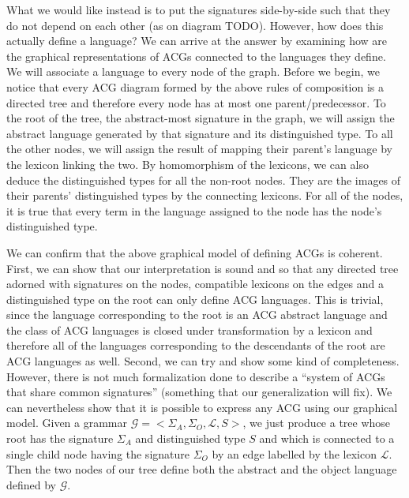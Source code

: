 What we would like instead is to put the signatures side-by-side such
that they do not depend on each other (as on diagram TODO). However, how
does this actually define a language? We can arrive at the answer by
examining how are the graphical representations of ACGs connected to the
languages they define. We will associate a language to every node of the
graph. Before we begin, we notice that every ACG diagram formed by the
above rules of composition is a directed tree and therefore every node
has at most one parent/predecessor. To the root of the tree, the
abstract-most signature in the graph, we will assign the abstract
language generated by that signature and its distinguished type. To all
the other nodes, we will assign the result of mapping their parent's
language by the lexicon linking the two. By homomorphism of the
lexicons, we can also deduce the distinguished types for all the
non-root nodes. They are the images of their parents' distinguished
types by the connecting lexicons. For all of the nodes, it is true that
every term in the language assigned to the node has the node's
distinguished type.

We can confirm that the above graphical model of defining ACGs is
coherent. First, we can show that our interpretation is sound and so
that any directed tree adorned with signatures on the nodes, compatible
lexicons on the edges and a distinguished type on the root can only
define ACG languages. This is trivial, since the language corresponding
to the root is an ACG abstract language and the class of ACG languages
is closed under transformation by a lexicon and therefore all of the
languages corresponding to the descendants of the root are ACG languages
as well. Second, we can try and show some kind of completeness. However,
there is not much formalization done to describe a ``system of ACGs that
share common signatures'' (something that our generalization will
fix). We can nevertheless show that it is possible to express any ACG
using our graphical model. Given a grammar $\mathcal{G} =
\mathopen{<}\Sigma_A, \Sigma_O, \mathcal{L}, S\mathclose{>}$, we just
produce a tree whose root has the signature $\Sigma_A$ and distinguished
type $S$ and which is connected to a single child node having the
signature $\Sigma_O$ by an edge labelled by the lexicon
$\mathcal{L}$. Then the two nodes of our tree define both the abstract
and the object language defined by $\mathcal{G}$.

